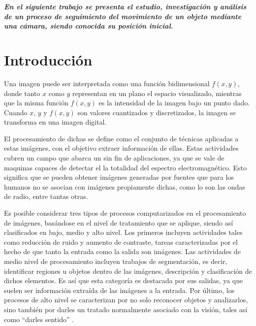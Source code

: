 









\textbf{\textit{En el siguiente trabajo se presenta el estudio, investigación y análisis de un proceso de seguimiento del movimiento de un objeto mediante una cámara, siendo conocida su posición inicial.}}



\section{Introducción}
Una imagen puede ser interpretada como una función bidimensional $f\left( x, y\right)$, donde tanto $x$ como $y$ representan en un plano el espacio visualizado, mientras que la misma función $f\left( x, y\right)$ es la intensidad de la imagen bajo un punto dado. Cuando $x$, $y$ y $f\left( x, y\right)$ son valores cuantizados y discretizados, la imagen se transforma en una imagen digital.
	 	
El procesamiento de dichas se define como el conjunto de técnicas aplicadas a estas imágenes, con el objetivo extraer información de ellas. Estas actividades cubren un campo que abarca un sin fin de aplicaciones, ya que se vale de maquinas capaces de detectar el la totalidad del espectro electromagnético. Esto significa que se pueden obtener imágenes generadas por fuentes que para los humanos no se asocian con imágenes propiamente dichas, como lo son las ondas de radio, entre tantas otras.
	
Es posible considerar tres tipos de procesos computarizados en el procesamiento de imágenes, basándose en el nivel de tratamiento que se aplique, siendo así clasificados en bajo, medio y alto nivel. Los primeros incluyen actividades tales como reducción de ruido y aumento de contraste, tareas caracterizadas por el hecho de que tanto la entrada como la salida son imágenes. Las actividades de medio nivel de procesamiento incluyen trabajos de segmentación, es decir, identificar regiones u objetos dentro de las imágenes, descripción y clasificación de dichos elementos. Es así que esta categoría es destacada por sus salidas, ya que suelen ser información extraída de las imágenes a la entrada. Por último, los procesos de alto nivel se caracterizan por no solo reconocer objetos y analizarlos, sino también por darles un tratado normalmente asociado con la visión, tales así como ``darles sentido'' \cite{ref:intro1}.
	

